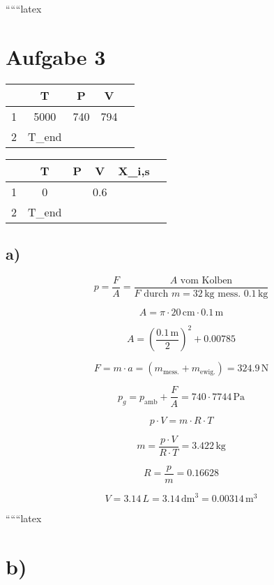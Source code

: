 
``````latex


\section*{Aufgabe 3}

\begin{tabular}{|c|c|c|c|c|}
\hline
 & T & P & V & \\
\hline
1 & 5000 & 740 & 794 & \\
\hline
2 & T_{end} & & & \\
\hline
\end{tabular}

\begin{tabular}{|c|c|c|c|c|c|}
\hline
 & T & P & V & X_{i,s} & \\
\hline
1 & 0 & & 0.6 & \\
\hline
2 & T_{end} & & & \\
\hline
\end{tabular}

\subsection*{a)}

\[
p = \frac{F}{A} = \frac{A \text{ vom Kolben}}{F \text{ durch } m = 32 \, \text{kg} \text{ mess. } 0.1 \, \text{kg}}
\]

\[
A = \pi \cdot 20 \, \text{cm} \cdot 0.1 \, \text{m}
\]

\[
A = \left( \frac{0.1 \, \text{m}}{2} \right)^2 + 0.00785
\]

\[
F = m \cdot a = (m_{\text{mess.}} + m_{\text{ewig.}}) = 324.9 \, \text{N}
\]

\[
p_g = p_{\text{amb}} + \frac{F}{A} = 740 \cdot 7744 \, \text{Pa}
\]

\[
p \cdot V = m \cdot R \cdot T
\]

\[
m = \frac{p \cdot V}{R \cdot T} = 3.422 \, \text{kg}
\]

\[
R = \frac{p}{m} = 0.16628
\]

\[
V = 3.14 \, L = 3.14 \, \text{dm}^3 = 0.00314 \, \text{m}^3
\]

``````latex


\section*{b)}

